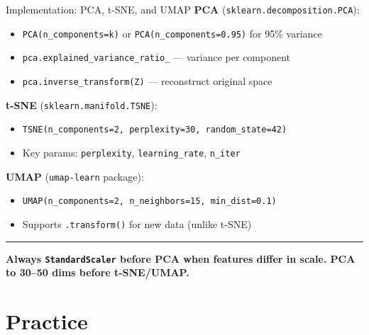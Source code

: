 \documentclass[8pt,aspectratio=169]{beamer}
\newcommand{\bottomnote}[1]{%
\vfill
\vspace{-2mm}
\textcolor{mllavender2}{\rule{\textwidth}{0.4pt}}
\vspace{1mm}
\footnotesize
\textbf{#1}
}
\begin{document}
\begin{frame}[t]{Implementation: PCA, t-SNE, and UMAP}
\textbf{PCA} (\texttt{sklearn.decomposition.PCA}):
\begin{itemize}
  \item \texttt{PCA(n\_components=k)} or \texttt{PCA(n\_components=0.95)} for 95\% variance
  \item \texttt{pca.explained\_variance\_ratio\_} --- variance per component
  \item \texttt{pca.inverse\_transform(Z)} --- reconstruct original space
\end{itemize}

\vspace{0.3em}
\textbf{t-SNE} (\texttt{sklearn.manifold.TSNE}):
\begin{itemize}
  \item \texttt{TSNE(n\_components=2, perplexity=30, random\_state=42)}
  \item Key params: \texttt{perplexity}, \texttt{learning\_rate}, \texttt{n\_iter}
\end{itemize}

\vspace{0.3em}
\textbf{UMAP} (\texttt{umap-learn} package):
\begin{itemize}
  \item \texttt{UMAP(n\_components=2, n\_neighbors=15, min\_dist=0.1)}
  \item Supports \texttt{.transform()} for new data (unlike t-SNE)
\end{itemize}
\bottomnote{Always \texttt{StandardScaler} before PCA when features differ in scale. PCA to 30--50 dims before t-SNE/UMAP.}
\end{frame}

\section{Practice}
\end{document}
